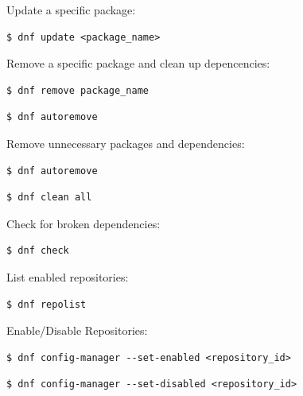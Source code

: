 \documentclass{article}
\newenvironment{codetemplate}[1][]{%
  \mybasecolorbox[#1]
  \itshape
}{%
  \endmybasecolorbox
}
\begin{document}
Update a specific package:
\begin{codetemplate}
\begin{verbatim}
$ dnf update <package_name>
\end{verbatim}
\end{codetemplate}

Remove a specific package and clean up depencencies:
\begin{codetemplate}
\begin{verbatim}
$ dnf remove package_name
\end{verbatim}
\end{codetemplate}
\begin{codetemplate}
\begin{verbatim}
$ dnf autoremove
\end{verbatim}
\end{codetemplate}

Remove unnecessary packages and dependencies:
\begin{codetemplate}
\begin{verbatim}
$ dnf autoremove
\end{verbatim}
\end{codetemplate}
\begin{codetemplate}
\begin{verbatim}
$ dnf clean all
\end{verbatim}
\end{codetemplate}

Check for broken dependencies:
\begin{codetemplate}
\begin{verbatim}
$ dnf check
\end{verbatim}
\end{codetemplate}

List enabled repositories:
\begin{codetemplate}
\begin{verbatim}
$ dnf repolist
\end{verbatim}
\end{codetemplate}

Enable/Disable Repositories:
\begin{codetemplate}
\begin{verbatim}
$ dnf config-manager --set-enabled <repository_id>
\end{verbatim}
\end{codetemplate}
\begin{codetemplate}
\begin{verbatim}
$ dnf config-manager --set-disabled <repository_id>
\end{verbatim}
\end{codetemplate}
\end{document}
